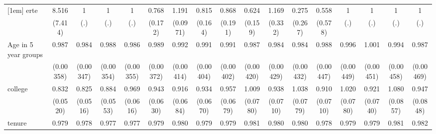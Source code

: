{\begin{tabular}{l*{16}{c}}
[1em]
erte                &       8.516\sym{*}  &           1         &           1         &           1         &       0.768         &       1.191\sym{*}  &       0.815         &       0.868         &       0.624         &       1.169         &       0.275         &       0.558         &           1         &           1         &           1         &           1         \\
                    &     (7.414)         &         (.)         &         (.)         &         (.)         &     (0.172)         &    (0.0971)         &     (0.164)         &     (0.191)         &     (0.159)         &     (0.332)         &     (0.267)         &     (0.578)         &         (.)         &         (.)         &         (.)         &         (.)         \\
[1em]
Age in 5 year groups&       0.987\sym{***}&       0.984\sym{***}&       0.988\sym{***}&       0.986\sym{***}&       0.989\sym{**} &       0.992\sym{*}  &       0.991\sym{*}  &       0.991\sym{*}  &       0.987\sym{**} &       0.984\sym{***}&       0.984\sym{***}&       0.988\sym{**} &       0.996         &       1.001         &       0.994         &       0.987\sym{**} \\
                    &   (0.00358)         &   (0.00347)         &   (0.00354)         &   (0.00355)         &   (0.00372)         &   (0.00414)         &   (0.00404)         &   (0.00402)         &   (0.00420)         &   (0.00429)         &   (0.00432)         &   (0.00447)         &   (0.00449)         &   (0.00451)         &   (0.00458)         &   (0.00469)         \\
[1em]
college             &       0.832\sym{**} &       0.825\sym{**} &       0.884\sym{*}  &       0.969         &       0.943         &       0.916         &       0.934         &       0.957         &       1.009         &       0.938         &       1.038         &       0.910         &       1.020         &       0.921         &       1.080         &       0.947         \\
                    &    (0.0520)         &    (0.0516)         &    (0.0553)         &    (0.0616)         &    (0.0630)         &    (0.0684)         &    (0.0670)         &    (0.0679)         &    (0.0780)         &    (0.0710)         &    (0.0779)         &    (0.0710)         &    (0.0780)         &    (0.0740)         &    (0.0857)         &    (0.0848)         \\
[1em]
tenure              &       0.979\sym{***}&       0.978\sym{***}&       0.977\sym{***}&       0.977\sym{***}&       0.979\sym{***}&       0.980\sym{***}&       0.979\sym{***}&       0.979\sym{***}&       0.981\sym{***}&       0.980\sym{***}&       0.980\sym{***}&       0.978\sym{***}&       0.979\sym{***}&       0.979\sym{***}&       0.981\sym{***}&       0.982\sym{***}\\

\end{tabular}}

